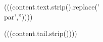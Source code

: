 \begin{solution}{}
(((content.text.strip().replace('\\par',''))))
\end{solution}
(((content.tail.strip())))

